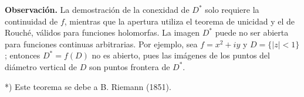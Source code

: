 \documentclass{article}
\begin{document}
\hrulefill

\textbf{Observación.} La demostración de la conexidad de \( D^* \) solo requiere la continuidad de \( f \), mientras que la apertura utiliza el teorema de unicidad y el de Rouché, válidos para funciones holomorfas. La imagen \( D^* \) puede no ser abierta para funciones continuas arbitrarias. Por ejemplo, sea \( f = x^2 + iy \) y \( D = \{|z| < 1\} \); entonces \( D^* = f(D) \) no es abierto, pues las imágenes de los puntos del diámetro vertical de \( D \) son puntos frontera de \( D^* \).

*) Este teorema se debe a B. Riemann (1851).
\end{document}

